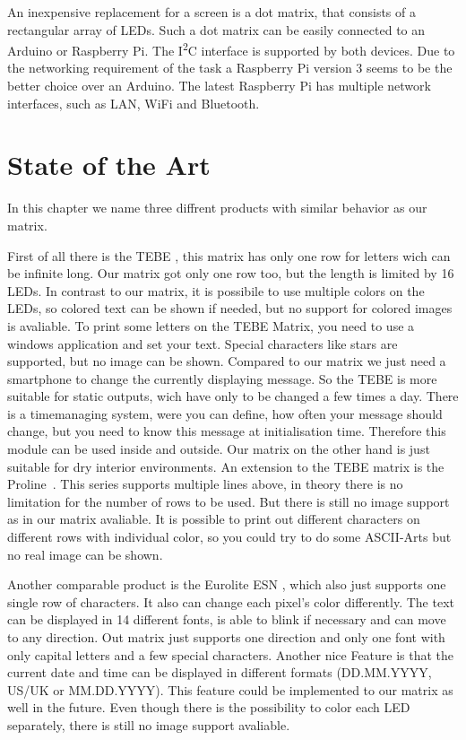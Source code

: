 \documentclass[conference]{IEEEtran}
\begin{document}
An inexpensive replacement for a screen is a dot matrix, that consists of a rectangular array of LEDs. Such a dot matrix can be easily connected to an Arduino or Raspberry Pi. The I\textsuperscript{2}C interface is supported by both devices. Due to the networking requirement of the task a Raspberry Pi version 3 seems to be the better choice over an Arduino. The latest Raspberry Pi has multiple network interfaces, such as LAN, WiFi and Bluetooth.


\section{State of the Art}
In this chapter we name three diffrent products with similar behavior as our matrix.

First of all there is the TEBE \cite{ledtebe}, this matrix has only one row for letters wich can be infinite long. Our matrix got only one row too, but the length is limited by 16 LEDs. In contrast to our matrix, it is possibile to use multiple colors on the LEDs, so colored text can be shown if needed, but no support for colored images is avaliable. To print some letters on the TEBE Matrix, you need to use a windows application and set your text. Special characters like stars are supported, but no image can be shown. Compared to our matrix we just need a smartphone to change the currently displaying message. So the TEBE is more suitable for static outputs, wich have only to be changed a few times a day. There is a timemanaging system, were you can define, how often your message should change, but you need to know this message at initialisation time. Therefore this module can be used inside and outside. Our matrix on the other hand is just suitable for dry interior environments. An extension to the TEBE matrix is the Proline~\cite{ledproline}. This series supports multiple lines above, in theory there is no limitation for the number of rows to be used. But there is still no image support as in our matrix avaliable. It is possible to print out different characters on different rows with individual color, so you could try to do some ASCII-Arts but no real image can be shown.

Another comparable product is the Eurolite ESN \cite{esn}, which also just supports one single row of characters. It also can change each pixel's color differently. The text can be displayed in 14 different fonts, is able to blink if necessary and can move to any direction. Out matrix just supports one direction and only one font with only capital letters and a few special characters. Another nice Feature is that the current date and time can be displayed in different formats (DD.MM.YYYY, US/UK or MM.DD.YYYY). This feature could be implemented to our matrix as well in the future. Even though there is the possibility to color each LED separately, there is still no image support avaliable.
\end{document}
